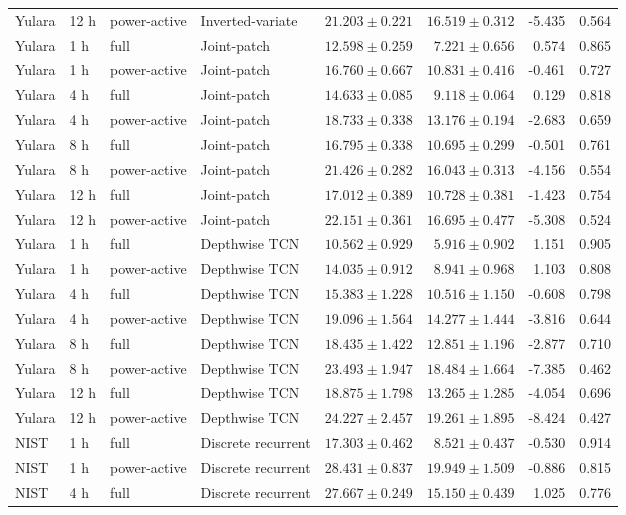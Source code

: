 \begin{longtable}{lll l rrrr}
Yulara & 12 h & power-active & Inverted-variate & $21.203\pm0.221$ & $16.519\pm0.312$ & -5.435 & 0.564\\
Yulara & 1 h & full & Joint-patch & $12.598\pm0.259$ & $7.221\pm0.656$ & 0.574 & 0.865\\
Yulara & 1 h & power-active & Joint-patch & $16.760\pm0.667$ & $10.831\pm0.416$ & -0.461 & 0.727\\
Yulara & 4 h & full & Joint-patch & $14.633\pm0.085$ & $9.118\pm0.064$ & 0.129 & 0.818\\
Yulara & 4 h & power-active & Joint-patch & $18.733\pm0.338$ & $13.176\pm0.194$ & -2.683 & 0.659\\
Yulara & 8 h & full & Joint-patch & $16.795\pm0.338$ & $10.695\pm0.299$ & -0.501 & 0.761\\
Yulara & 8 h & power-active & Joint-patch & $21.426\pm0.282$ & $16.043\pm0.313$ & -4.156 & 0.554\\
Yulara & 12 h & full & Joint-patch & $17.012\pm0.389$ & $10.728\pm0.381$ & -1.423 & 0.754\\
Yulara & 12 h & power-active & Joint-patch & $22.151\pm0.361$ & $16.695\pm0.477$ & -5.308 & 0.524\\
Yulara & 1 h & full & Depthwise TCN & $10.562\pm0.929$ & $5.916\pm0.902$ & 1.151 & 0.905\\
Yulara & 1 h & power-active & Depthwise TCN & $14.035\pm0.912$ & $8.941\pm0.968$ & 1.103 & 0.808\\
Yulara & 4 h & full & Depthwise TCN & $15.383\pm1.228$ & $10.516\pm1.150$ & -0.608 & 0.798\\
Yulara & 4 h & power-active & Depthwise TCN & $19.096\pm1.564$ & $14.277\pm1.444$ & -3.816 & 0.644\\
Yulara & 8 h & full & Depthwise TCN & $18.435\pm1.422$ & $12.851\pm1.196$ & -2.877 & 0.710\\
Yulara & 8 h & power-active & Depthwise TCN & $23.493\pm1.947$ & $18.484\pm1.664$ & -7.385 & 0.462\\
Yulara & 12 h & full & Depthwise TCN & $18.875\pm1.798$ & $13.265\pm1.285$ & -4.054 & 0.696\\
Yulara & 12 h & power-active & Depthwise TCN & $24.227\pm2.457$ & $19.261\pm1.895$ & -8.424 & 0.427\\
NIST & 1 h & full & Discrete recurrent & $17.303\pm0.462$ & $8.521\pm0.437$ & -0.530 & 0.914\\
NIST & 1 h & power-active & Discrete recurrent & $28.431\pm0.837$ & $19.949\pm1.509$ & -0.886 & 0.815\\
NIST & 4 h & full & Discrete recurrent & $27.667\pm0.249$ & $15.150\pm0.439$ & 1.025 & 0.776\\

\end{longtable}
